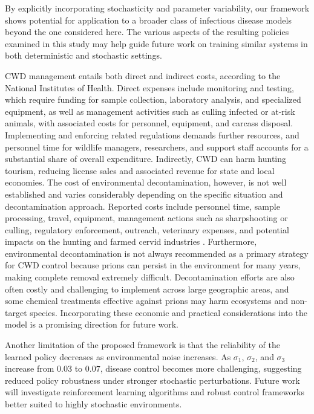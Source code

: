 \documentclass[12pt,a4paper,reqno]{amsart}
\theoremstyle{definition}
\theoremstyle{remark}
\theoremstyle{plain}
\begin{document}
By explicitly incorporating stochasticity and parameter variability, our framework shows potential for application to a broader class of infectious disease models beyond the one considered here. The various aspects of the resulting policies examined in this study may help guide future work on training similar systems in both deterministic and stochastic settings.

CWD management entails both direct and indirect costs, according to the National Institutes of Health. Direct expenses include monitoring and testing, which require funding for sample collection, laboratory analysis, and specialized equipment, as well as management activities such as culling infected or at-risk animals, with associated costs for personnel, equipment, and carcass disposal. Implementing and enforcing related regulations demands further resources, and personnel time for wildlife managers, researchers, and support staff accounts for a substantial share of overall expenditure. Indirectly, CWD can harm hunting tourism, reducing license sales and associated revenue for state and local economies. The cost of environmental decontamination, however, is not well established and varies considerably depending on the specific situation and decontamination approach. Reported costs include personnel time, sample processing, travel, equipment, management actions such as sharpshooting or culling, regulatory enforcement, outreach, veterinary expenses, and potential impacts on the hunting and farmed cervid industries \cite{chiavacci2022economic}. Furthermore, environmental decontamination is not always recommended as a primary strategy for CWD control because prions can persist in the environment for many years, making complete removal extremely difficult. Decontamination efforts are also often costly and challenging to implement across large geographic areas, and some chemical treatments effective against prions may harm ecosystems and non-target species. Incorporating these economic and practical considerations into the model is a promising direction for future work.

Another limitation of the proposed framework is that the reliability of the learned policy decreases as environmental noise increases. As $\sigma_1$, $\sigma_2$, and $\sigma_3$ increase from $0.03$ to $0.07$, disease control becomes more challenging, suggesting reduced policy robustness under stronger stochastic perturbations. Future work will investigate reinforcement learning algorithms and robust control frameworks better suited to highly stochastic environments.
\end{document}
